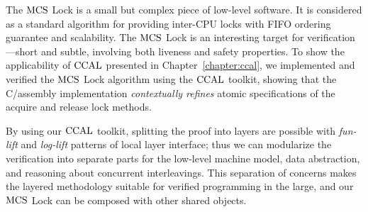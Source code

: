

The $\mathrm{MCS}$ Lock is a small but complex piece of low-level software.
It is considered as a standard algorithm for providing inter-CPU locks with FIFO ordering guarantee and scalability.
The $\mathrm{MCS}$ Lock is an interesting target for verification---short and subtle, involving both liveness and safety properties. 
To show the applicability of $\mathrm{CCAL}$ presented in Chapter~\ref{chapter:ccal},
we implemented and verified the $\mathrm{MCS}$ Lock algorithm using the $\mathrm{CCAL}$ toolkit, 
showing that the C/assembly implementation {\em contextually refines} atomic specifications of the acquire and release lock methods.

By using our $\mathrm{CCAL}$ toolkit, splitting the proof into layers are possible with  \textit{fun-lift} and \textit{log-lift} patterns of local layer interface;
thus we can modularize the verification into separate parts for the low-level machine model, data abstraction, and reasoning about concurrent interleavings.
This separation of concerns makes the layered methodology suitable for verified programming in the large, and our 
$\mathrm{MCS}$ Lock can be composed with other shared objects.

